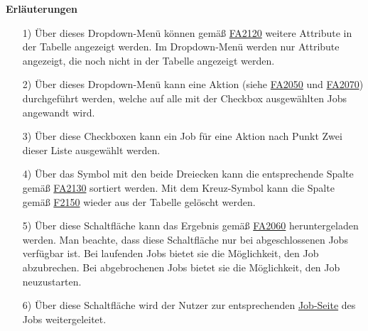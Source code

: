 \textbf{Erläuterungen}
\begin{itemize}
    \item[1)] Über dieses Dropdown-Menü können gemäß \hyperref[FA:Web-Interface:Hinzufügen von Spalten]{FA2120} weitere Attribute in der Tabelle angezeigt werden. Im Dropdown-Menü werden nur Attribute angezeigt, die noch nicht in der Tabelle angezeigt werden.
    \item[2)] Über dieses Dropdown-Menü kann eine Aktion (siehe \hyperref[FA:Web-Interface:Abbruch mehrerer Jobs auf einmal]{FA2050} und \hyperref[FA:Web-Interface:herunterladen mehrerer Ergebnisse auf einmal]{FA2070}) durchgeführt werden, welche auf alle mit der Checkbox ausgewählten Jobs angewandt wird.
    \item[3)] Über diese Checkboxen kann ein Job für eine Aktion nach Punkt Zwei dieser Liste ausgewählt werden.
    \item[4)] Über das Symbol mit den beide Dreiecken kann die entsprechende Spalte gemäß \hyperref[FA:Web-Interface:Sortieren der Tabelle]{FA2130} sortiert werden. Mit dem Kreuz-Symbol kann die Spalte gemäß \hyperref[FA:Web-Interface:Entfernen von Spalten]{F2150} wieder aus der Tabelle gelöscht werden.
    \item[5)] Über diese Schaltfläche kann das Ergebnis gemäß \hyperref[FA:Web-Interface:Herunterladen eines einzelnen Ergebnisses]{FA2060} heruntergeladen werden. Man beachte, dass diese Schaltfläche nur bei abgeschlossenen Jobs verfügbar ist. Bei laufenden Jobs bietet sie die Möglichkeit, den Job abzubrechen. Bei abgebrochenen Jobs bietet sie die Möglichkeit, den Job neuzustarten.
    \item[6)] Über diese Schaltfläche wird der Nutzer zur entsprechenden \hyperref[pages:job-page]{Job-Seite} des Jobs weitergeleitet.
\end{itemize}

\newpage
